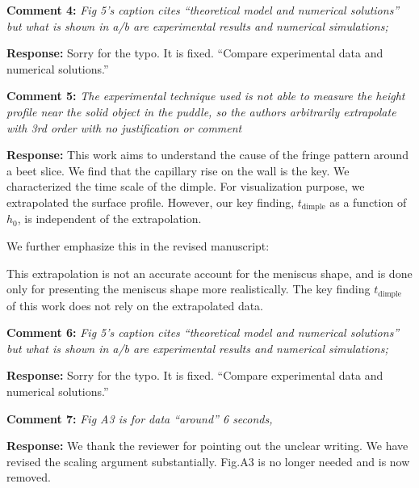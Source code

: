 \documentclass[11pt]{article}
\newif\ifhighlight
\newcommand{\hl}[1]{\ifhighlight\textcolor{blue}{#1}\else#1\fi}
\begin{document}
\bigskip
\begin{siderules}
\textbf{Comment 4:} \textit{Fig 5’s caption cites “theoretical model and numerical solutions” but what is shown in a/b are experimental results and numerical simulations;}
\end{siderules}

\textbf{Response:} Sorry for the typo. It is fixed. \hl{``Compare experimental data and numerical solutions.''}

\bigskip
\begin{siderules}
\textbf{Comment 5:} \textit{The experimental technique used is not able to measure the height profile near the solid object in the puddle, so the authors arbitrarily extrapolate with 3rd order with no justification or comment}
\end{siderules}

\textbf{Response:} This work aims to understand the cause of the fringe pattern around a beet slice. We find that the capillary rise on the wall is the key. We characterized the time scale of the dimple. For visualization purpose, we extrapolated the surface profile. However, our key finding, $t_\mathrm{dimple}$ as a function of $h_0$, is independent of the extrapolation. 
	
We further emphasize this in the revised manuscript:

\hl{
This extrapolation is not an accurate account for the meniscus shape, and is done only for presenting the meniscus shape more realistically. The key finding $t_\mathrm{dimple}$ of this work does not rely on the extrapolated data.
}

\bigskip
\begin{siderules}
\textbf{Comment 6:} \textit{Fig 5’s caption cites “theoretical model and numerical solutions” but what is shown in a/b are experimental results and numerical simulations;}
\end{siderules}

\textbf{Response:} Sorry for the typo. It is fixed. \hl{``Compare experimental data and numerical solutions.''}

\bigskip
\begin{siderules}
\textbf{Comment 7:} \textit{Fig A3 is for data “around” 6 seconds,}
\end{siderules}

\textbf{Response:} We thank the reviewer for pointing out the unclear writing. We have revised the scaling argument substantially. \hl{Fig.A3 is no longer needed and is now removed.}
\end{document}
